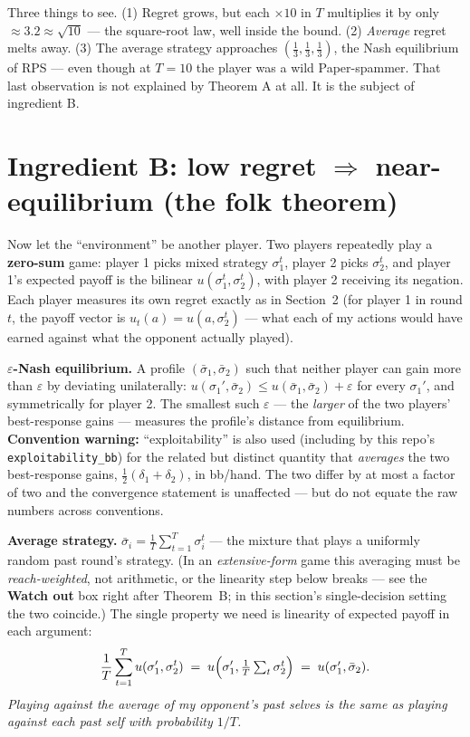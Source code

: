 \documentclass[11pt,a4paper]{article}
\begin{document}
Three things to see. (1) Regret grows, but each $\times 10$ in $T$ multiplies
it by only ${\approx}3.2 \approx \sqrt{10}$ --- the square-root law, well
inside the bound. (2) \emph{Average} regret melts away. (3) The average
strategy approaches $(\tfrac13,\tfrac13,\tfrac13)$, the Nash equilibrium of
RPS --- even though at $T{=}10$ the player was a wild Paper-spammer. That
last observation is not explained by Theorem A at all. It is the subject of
ingredient B.

\section{Ingredient B: low regret $\Rightarrow$ near-equilibrium (the folk
theorem)}

Now let the ``environment'' be another player. Two players repeatedly play a
\textbf{zero-sum} game: player 1 picks mixed strategy $\sigma_1^t$, player 2
picks $\sigma_2^t$, and player 1's expected payoff is the bilinear
$u(\sigma_1^t, \sigma_2^t)$, with player 2 receiving its negation. Each
player measures its own regret exactly as in Section~2 (for player 1 in round
$t$, the payoff vector is $u_t(a) = u(a, \sigma_2^t)$ --- what each of my
actions would have earned against what the opponent actually played).

\begin{defbox}
\textbf{$\varepsilon$-Nash equilibrium.} A profile
$(\bar\sigma_1,\bar\sigma_2)$ such that neither player can gain more than
$\varepsilon$ by deviating unilaterally:
$u(\sigma_1',\bar\sigma_2) \le u(\bar\sigma_1,\bar\sigma_2) + \varepsilon$
for every $\sigma_1'$, and symmetrically for player 2. The smallest such
$\varepsilon$ --- the \emph{larger} of the two players' best-response gains ---
measures the profile's distance from equilibrium. \textbf{Convention warning:}
``exploitability'' is also used (including by this repo's
\texttt{exploitability\_bb}) for the related but distinct quantity that
\emph{averages} the two best-response gains, $\tfrac12(\delta_1+\delta_2)$, in
bb/hand. The two differ by at most a factor of two and the convergence
statement is unaffected --- but do not equate the raw numbers across
conventions.
\end{defbox}

\begin{defbox}
\textbf{Average strategy.} $\bar\sigma_i = \frac1T\sum_{t=1}^{T}\sigma_i^t$ ---
the mixture that plays a uniformly random past round's strategy. (In an
\emph{extensive-form} game this averaging must be \emph{reach-weighted}, not
arithmetic, or the linearity step below breaks --- see the \textbf{Watch out}
box right after Theorem~B; in this section's single-decision setting the two
coincide.) The single property we need is linearity of expected payoff in each
argument:
\[
\frac1T \sum_{t=1}^{T} u(\sigma_1', \sigma_2^t) \;=\;
u\Bigl(\sigma_1', \tfrac1T\textstyle\sum_t \sigma_2^t\Bigr) \;=\;
u(\sigma_1', \bar\sigma_2).
\]
\emph{Playing against the average of my opponent's past selves is the same as
playing against each past self with probability $1/T$.}
\end{defbox}
\end{document}
